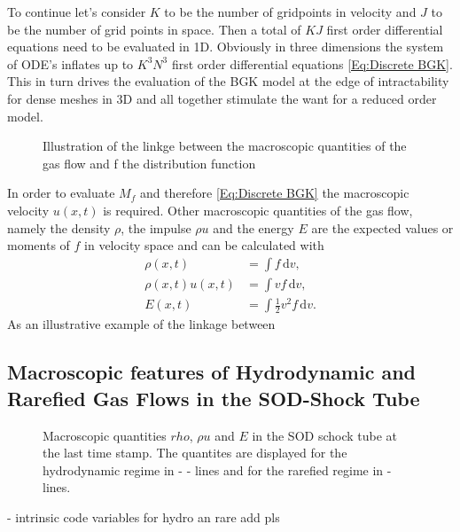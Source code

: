 \documentclass[12pt, a4paper]{article}
\begin{document}
To continue let's consider \(K\) to be the number of gridpoints in velocity and \(J\) to be the number of grid points in space. Then a total of \(KJ\) first order differential equations need to be evaluated in 1D. Obviously in three dimensions the system of ODE's inflates up to \(K^3N^3\) first order differential equations \cref{Eq:Discrete BGK}. This in turn drives the evaluation of the BGK model at the edge of intractability for dense meshes in 3D and all together stimulate the want for a reduced order model.\\
\begin{figure}
	\begin{center}
		\scalebox{.9}{}
	\end{center}
	\caption{Illustration of the linkge between the macroscopic quantities of the gas flow and f the distribution function}
\end{figure}
In order to evaluate \(M_f\) and therefore \cref{Eq:Discrete BGK} the macroscopic velocity \(u(x,t)\) is required. Other macroscopic quantities of the gas flow, namely  the density \(\rho\), the impulse \(\rho u\) and the energy \(E\) are the expected values or moments of \(f\) in velocity space and can be calculated with 
\begin{align}
	\rho(x,t) &= \int\! f \,\mathrm{d}v \mathrm{,} 
	\\
	\rho(x,t) u(x,t) &= \int\! v f \,\mathrm{d}v \mathrm{,}
	\\
	E(x,t) &= \int\! \frac{1}{2}v^2 f  \,\mathrm{d}v \mathrm{.}
\end{align}
As an illustrative example of the linkage between 
\subsection{Macroscopic features of Hydrodynamic and Rarefied Gas Flows in the SOD-Shock Tube} \label{FeaturesSOD}
\begin{figure}[!htbp]
	
	\caption{Macroscopic quantities \(rho\), \(\rho u\) and \(E\) in the SOD schock tube at the last time stamp. The quantites are displayed for the hydrodynamic regime in - - lines and for the rarefied regime in - lines.}
\end{figure}
- intrinsic code variables for hydro an rare add pls
\end{document}
